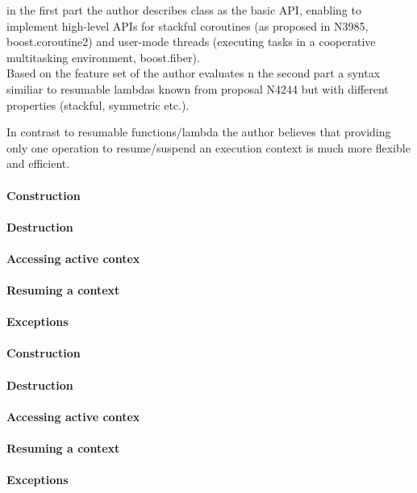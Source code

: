 in the first part the author describes class \ectx as the basic API, enabling to
implement high-level APIs for stackful coroutines (as proposed in
N3985\cite{N3985}, boost.coroutine2\cite{bcoroutine2}) and user-mode threads
(executing tasks in a cooperative multitasking environment,
boost.fiber\cite{bfiber}).\\
Based on the feature set of \ectx the author evaluates n the second part a
syntax similiar to resumable lambdas known from proposal N4244 but with
different properties (stackful, symmetric etc.).

In contrast to resumable functions/lambda the author believes that providing
only one operation to resume/suspend an execution context is much more flexible
and efficient.\\

\paragraph{Construction}
\paragraph{Destruction}
\paragraph{Accessing active contex}
\paragraph{Resuming a context}
\paragraph{Exceptions}

\paragraph{Construction}
\paragraph{Destruction}
\paragraph{Accessing active contex}
\paragraph{Resuming a context}
\paragraph{Exceptions}
